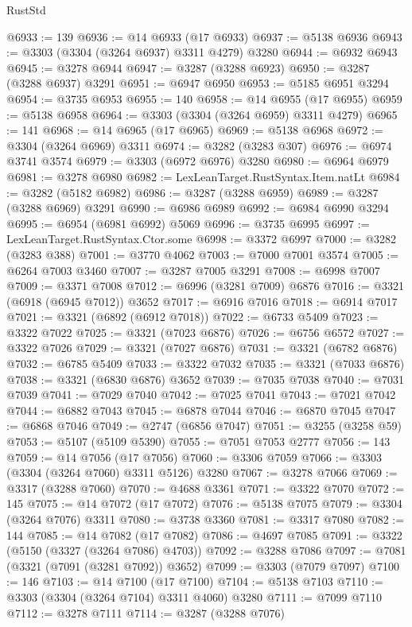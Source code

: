 \begin{lexlean}{RustStd}
\begin{coremodule}
@6933 := 139
@6936 := @14 @6933 (@17 @6933)
@6937 := @5138 @6936
@6943 := @3303 (@3304 (@3264 @6937) @3311 @4279) @3280
@6944 := @6932 @6943
@6945 := @3278 @6944
@6947 := @3287 (@3288 @6923)
@6950 := @3287 (@3288 @6937) @3291
@6951 := @6947 @6950
@6953 := @5185 @6951 @3294
@6954 := @3735 @6953
@6955 := 140
@6958 := @14 @6955 (@17 @6955)
@6959 := @5138 @6958
@6964 := @3303 (@3304 (@3264 @6959) @3311 @4279)
@6965 := 141
@6968 := @14 @6965 (@17 @6965)
@6969 := @5138 @6968
@6972 := @3304 (@3264 @6969) @3311
@6974 := @3282 (@3283 @307)
@6976 := @6974 @3741 @3574
@6979 := @3303 (@6972 @6976) @3280
@6980 := @6964 @6979
@6981 := @3278 @6980
@6982 := LexLeanTarget.RustSyntax.Item.natLt
@6984 := @3282 (@5182 @6982)
@6986 := @3287 (@3288 @6959)
@6989 := @3287 (@3288 @6969) @3291
@6990 := @6986 @6989
@6992 := @6984 @6990 @3294
@6995 := @6954 (@6981 @6992) @5069
@6996 := @3735 @6995
@6997 := LexLeanTarget.RustSyntax.Ctor.some
@6998 := @3372 @6997
@7000 := @3282 (@3283 @388)
@7001 := @3770 @4062
@7003 := @7000 @7001 @3574
@7005 := @6264 @7003 @3460
@7007 := @3287 @7005 @3291
@7008 := @6998 @7007
@7009 := @3371 @7008
@7012 := @6996 (@3281 @7009) @6876
@7016 := @3321 (@6918 (@6945 @7012)) @3652
@7017 := @6916 @7016
@7018 := @6914 @7017
@7021 := @3321 (@6892 (@6912 @7018))
@7022 := @6733 @5409
@7023 := @3322 @7022
@7025 := @3321 (@7023 @6876)
@7026 := @6756 @6572
@7027 := @3322 @7026
@7029 := @3321 (@7027 @6876)
@7031 := @3321 (@6782 @6876)
@7032 := @6785 @5409
@7033 := @3322 @7032
@7035 := @3321 (@7033 @6876)
@7038 := @3321 (@6830 @6876) @3652
@7039 := @7035 @7038
@7040 := @7031 @7039
@7041 := @7029 @7040
@7042 := @7025 @7041
@7043 := @7021 @7042
@7044 := @6882 @7043
@7045 := @6878 @7044
@7046 := @6870 @7045
@7047 := @6868 @7046
@7049 := @2747 (@6856 @7047)
@7051 := @3255 (@3258 @59)
@7053 := @5107 (@5109 @5390)
@7055 := @7051 @7053 @2777
@7056 := 143
@7059 := @14 @7056 (@17 @7056)
@7060 := @3306 @7059
@7066 := @3303 (@3304 (@3264 @7060) @3311 @5126) @3280
@7067 := @3278 @7066
@7069 := @3317 (@3288 @7060)
@7070 := @4688 @3361
@7071 := @3322 @7070
@7072 := 145
@7075 := @14 @7072 (@17 @7072)
@7076 := @5138 @7075
@7079 := @3304 (@3264 @7076) @3311
@7080 := @3738 @3360
@7081 := @3317 @7080
@7082 := 144
@7085 := @14 @7082 (@17 @7082)
@7086 := @4697 @7085
@7091 := @3322 (@5150 (@3327 (@3264 @7086) @4703))
@7092 := @3288 @7086
@7097 := @7081 (@3321 (@7091 (@3281 @7092)) @3652)
@7099 := @3303 (@7079 @7097)
@7100 := 146
@7103 := @14 @7100 (@17 @7100)
@7104 := @5138 @7103
@7110 := @3303 (@3304 (@3264 @7104) @3311 @4060) @3280
@7111 := @7099 @7110
@7112 := @3278 @7111
@7114 := @3287 (@3288 @7076)

\end{coremodule}
\end{lexlean}
